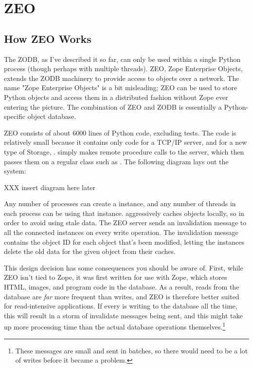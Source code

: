 
   
\section{ZEO}
\label{zeo}

\subsection{How ZEO Works}

The ZODB, as I've described it so far, can only be used within a
single Python process (though perhaps with multiple threads).  ZEO,
Zope Enterprise Objects, extends the ZODB machinery to provide access
to objects over a network.  The name "Zope Enterprise Objects" is a
bit misleading; ZEO can be used to store Python objects and access
them in a distributed fashion without Zope ever entering the picture.
The combination of ZEO and ZODB is essentially a Python-specific
object database.

ZEO consists of about 6000 lines of Python code, excluding tests.  The
code is relatively small because it contains only code for a TCP/IP
server, and for a new type of Storage, .
 simply makes remote procedure calls to the
server, which then passes them on a regular  class such
as .  The following diagram lays out the system:

XXX insert diagram here later

Any number of processes can create a 
instance, and any number of threads in each process can be using that
instance.   aggressively caches objects
locally, so in order to avoid using stale data.  The ZEO server sends
an invalidation message to all the connected 
instances on every write operation.  The invalidation message contains
the object ID for each object that's been modified, letting the
 instances delete the old data for the
given object from their caches.

This design decision has some consequences you should be aware of.
First, while ZEO isn't tied to Zope, it was first written for use with
Zope, which stores HTML, images, and program code in the database.  As
a result, reads from the database are \emph{far} more frequent than
writes, and ZEO is therefore better suited for read-intensive
applications.  If every  is writing to the
database all the time, this will result in a storm of invalidate
messages being sent, and this might take up more processing time than
the actual database operations themselves.\footnote{These messages are
small and sent in batches, so there would need to be a lot of writes
before it became a problem.}

